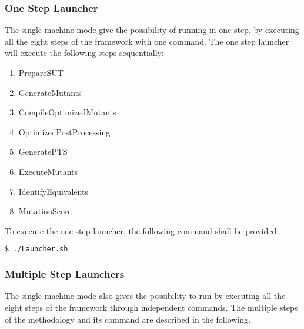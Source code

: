 \subsubsection{One Step Launcher}

The single machine mode give the possibility of running \MASS in one step, by executing all the eight steps of the framework with one command. The one step launcher will execute the following steps sequentially:

\begin{enumerate}
	\item PrepareSUT
	\item GenerateMutants
	\item CompileOptimizedMutants
	\item OptimizedPostProcessing
	\item GeneratePTS
	\item ExecuteMutants
	\item IdentifyEquivalents
	\item MutationScore
\end{enumerate}

To execute the one step launcher, the following command shall be provided:

\begin{lstlisting}[language=bash]
  $ ./Launcher.sh
\end{lstlisting}

\subsubsection{Multiple Step Launchers}

The single machine mode also gives the possibility to run \MASS by executing all the eight steps of the framework through independent commands. 
The multiple steps of the methodology and its command are described in the following.

